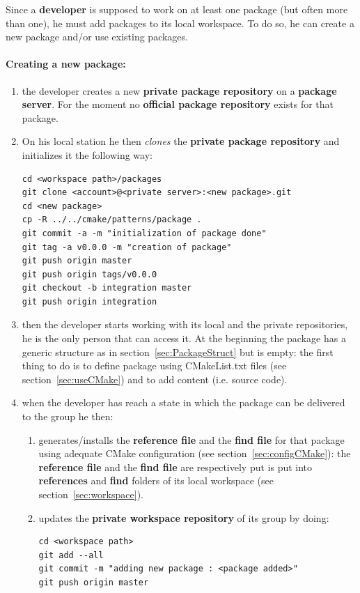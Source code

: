 \documentclass[12pt,a4paper]{article}
\begin{document}
Since a \textbf{developer} is supposed to work on at least one package (but often more than one), he must add packages to its local workspace. To do so, he can create a new package and/or use existing packages.

\paragraph{Creating a new package:}
\begin{enumerate}
\item the developer creates a new \textbf{private package repository} on a \textbf{package server}. For the moment no \textbf{official package repository} exists for that package.
\item On his local station he then \textit{clones} the \textbf{private package repository} and initializes it the following way:
\begin{verbatim}
cd <workspace path>/packages
git clone <account>@<private server>:<new package>.git
cd <new package>
cp -R ../../cmake/patterns/package .
git commit -a -m "initialization of package done"
git tag -a v0.0.0 -m "creation of package"
git push origin master
git push origin tags/v0.0.0
git checkout -b integration master
git push origin integration
\end{verbatim}
\item then the developer starts working with its local and the private repositories, he is the only person that can access it. At the beginning the package has a generic structure as in section~\ref{sec:PackageStruct} but is empty: the first thing to do is to define package using CMakeList.txt files (see section~\ref{sec:useCMake}) and to add content (i.e. source code).
\item when the developer has reach a state in which the package can be delivered to the group he then:
\begin{enumerate}
\item generates/installs the \textbf{reference file} and the \textbf{find file} for that package using adequate CMake configuration (see section~\ref{sec:configCMake}): the \textbf{reference file} and the \textbf{find file} are respectively put is put into \textbf{references} and \textbf{find} folders of its local workspace (see section~\ref{sec:workspace}).
\item updates the \textbf{private workspace repository} of its group by doing:
\begin{verbatim}
cd <workspace path>
git add --all
git commit -m "adding new package : <package added>"
git push origin master
\end{verbatim}
\end{enumerate}
\end{enumerate}
\end{document}
